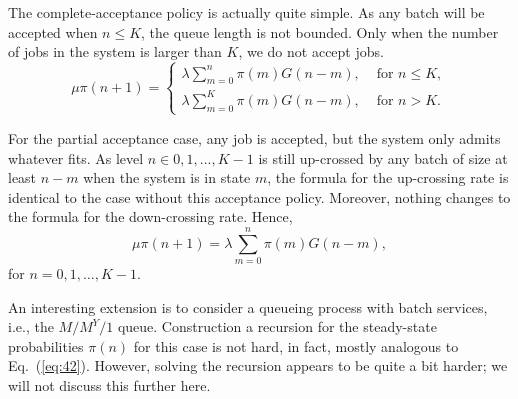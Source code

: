 \begin{exercise}{\faPhoto}
\begin{solution}
  The complete-acceptance policy is actually quite simple. As any
  batch will be accepted when $n\leq K$, the queue length is not
  bounded.  Only when the number of jobs in the system is larger than
  $K$, we do not accept jobs. 
  \begin{equation*}
    \mu \pi(n+1) = 
    \begin{cases}
      \lambda \sum_{m=0}^n \pi(m) G(n-m), & \text{ for } n\leq K,\\
      \lambda \sum_{m=0}^K \pi(m) G(n-m), & \text{ for } n> K.
    \end{cases}
  \end{equation*}





  For the partial acceptance case, any job is accepted, but the system
  only admits whatever fits.  As level $n\in {0,1,...,K-1}$ is still up-crossed by any batch of size at least $n-m$ when the system is in state $m$, the formula for the up-crossing rate is identical to the case without this acceptance policy. Moreover, nothing changes to the formula for the down-crossing rate. Hence, 
  \begin{equation*}
    \mu \pi(n+1) = \lambda \sum_{m=0}^n \pi(m) G(n-m), 
  \end{equation*}
  for $n=0,1,\ldots, K-1$. 
\end{solution}
\end{exercise}


\begin{exercise}{\faRocket}
An interesting extension is to consider a queueing process with batch
services, i.e., the $M/M^Y/1$ queue. Construction a recursion for the
steady-state probabilities $\pi(n)$ for this case is not hard, in fact,
mostly analogous to Eq.~(\ref{eq:42}).  However, solving the recursion
appears to be quite a bit harder; we will not discuss this further here.
\end{exercise}






